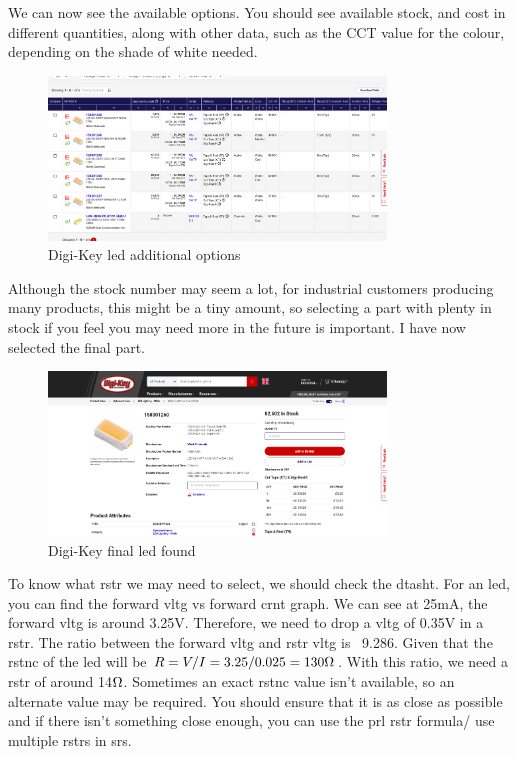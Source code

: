 \documentclass[a4paper,11pt]{report}
\begin{document}
We can now see the available options. You should see available stock, and cost in different quantities, along with other data, such as the CCT value for the colour, depending on the shade of white needed.


\begin{figure}[H]
\centering
\includegraphics[width=0.8\textwidth]{screenshots/DigiKeyWhiteledPageOptions}
\caption{Digi-Key \gls{led} additional options}
\end{figure}

Although the stock number may seem a lot, for industrial customers producing many products, this might be a tiny amount, so selecting a part with plenty in stock if you feel you may need more in the future is important. I have now selected the final part.


\begin{figure}[H]
\centering
\includegraphics[width=0.8\textwidth]{screenshots/DigiKeyWhiteledFinalPart}
\caption{Digi-Key final \gls{led} found}
\end{figure}

To know what \gls{rstr} we may need to select, we should check the \gls{dtasht}. For an \gls{led}, you can find the forward \gls{vltg} vs forward \gls{crnt} graph. We can see at 25mA, the forward \gls{vltg} is around 3.25V. Therefore, we need to drop a \gls{vltg} of 0.35V in a \gls{rstr}. The ratio between the forward \gls{vltg} and \gls{rstr} \gls{vltg} is ~9.286. Given that the \gls{rstnc} of the \gls{led} will be $R=V/I=3.25/0.025=130\ohm$. With this ratio, we need a \gls{rstr} of around 14$\ohm$. Sometimes an exact \gls{rstnc} value isn't available, so an alternate value may be required. You should ensure that it is as close as possible and if there isn't something close enough, you can use the \gls{prl} \gls{rstr} formula/ use multiple \gls{rstr}s in \gls{srs}.
\end{document}
